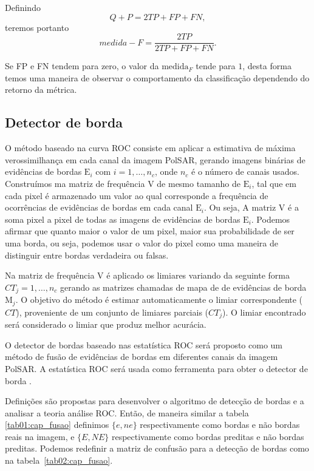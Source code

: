 Definindo
\begin{equation}\nonumber
     Q+P=2TP+FP+FN,
\end{equation}
teremos portanto
\begin{equation}\nonumber
	medida-F=\frac{2TP}{2TP+FP+FN}.
\end{equation}

Se FP e FN tendem para zero, o valor da $\text{medida}_F$ tende para $1$, desta forma temos uma maneira de observar o comportamento da classificação dependendo do retorno da métrica.
 
\subsection{Detector de borda}
O método baseado na curva ROC consiste em aplicar a estimativa de máxima verossimilhança em cada canal da imagem PolSAR, gerando imagens binárias de evidências de bordas $\text{E}_i$ com $i=1,\dots,n_c$, onde $n_c$ é o número de canais usados. Construímos ma matriz de frequência V de mesmo tamanho de $\text{E}_i$, tal que em cada pixel é armazenado um valor ao qual corresponde a frequência de ocorrências de evidências de bordas em cada canal $\text{E}_i$. Ou seja, A matriz V é a soma pixel a pixel de todas as imagens de  evidências de bordas $\text{E}_i$. Podemos afirmar que quanto maior o valor de um pixel, maior sua probabilidade de ser uma borda, ou seja, podemos usar o valor do pixel como uma maneira de distinguir entre bordas verdadeira ou falsas.

Na matriz de frequência V é aplicado os limiares variando da seguinte forma  $CT_j=1,\dots,n_c$ gerando as matrizes chamadas de mapa de de evidências de borda $\text{M}_j$. O objetivo do método é estimar automaticamente o limiar correspondente ($CT$),  proveniente de um conjunto de limiares parciais ($CT_j$). O limiar encontrado será considerado o limiar que produz melhor acurácia.  

O detector de bordas baseado nas estatística ROC será proposto como um método de fusão de evidências de bordas em diferentes canais da imagem PolSAR. A estatística ROC será usada como ferramenta para obter o detector de borda .

Definições são propostas para desenvolver o algoritmo de detecção de bordas e a analisar a teoria análise ROC. Então, de maneira similar a tabela \eqref{tab01:cap_fusao} definimos $\{e, ne\}$ respectivamente como bordas e não bordas reais na imagem, e $\{E, NE\}$ respectivamente como bordas preditas e não bordas preditas. 
Podemos redefinir a matriz de confusão para a detecção de bordas como na tabela~\ref{tab02:cap_fusao}.
 
